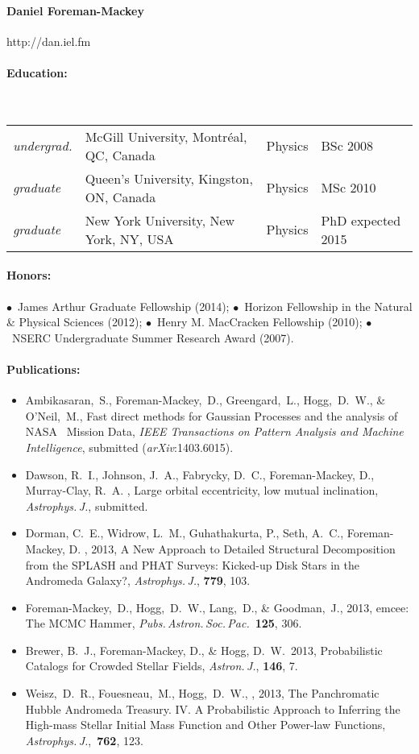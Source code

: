 \documentclass[letterpaper,12pt]{article}
\begin{document}
\paragraph{Daniel Foreman-Mackey} http://dan.iel.fm

\paragraph{Education:}~\\[3pt]
\begin{tabular}{llll}
\textsl{undergrad.}
  & McGill University, Montr\'eal, QC, Canada & Physics & BSc 2008\\
\textsl{graduate}
  & Queen's University, Kingston, ON, Canada & Physics & MSc 2010\\
\textsl{graduate}
  & New York University, New York, NY, USA & Physics & PhD expected 2015
\end{tabular}

\paragraph{Honors:}
$\bullet$~James Arthur Graduate Fellowship (2014);
$\bullet$~Horizon Fellowship in the Natural \& Physical Sciences (2012);
$\bullet$~Henry M. MacCracken Fellowship (2010);
$\bullet$~NSERC Undergraduate Summer Research Award (2007).

\paragraph{Publications:}
\begin{itemize}\setlength{\itemsep}{0pt}
\item
Ambikasaran,~S., Foreman-Mackey,~D., Greengard,~L., Hogg,~D.~W., \& O'Neil,~M.,
{Fast direct methods for Gaussian Processes and the analysis of NASA \Kepler\
Mission Data},
\textit{IEEE Transactions on Pattern Analysis and Machine Intelligence},
submitted (\textit{arXiv}:{1403.6015}).
\item
Dawson, R.~I., Johnson, J.~A., Fabrycky, D.~C., Foreman-Mackey, D.,
Murray-Clay, R.~A. \etal,
{Large orbital eccentricity, low mutual inclination},
\textit{Astrophys.\,J.}, submitted.
\item
Dorman, C.~E., Widrow, L.~M., Guhathakurta, P., Seth, A.~C., Foreman-Mackey,
D. \etal, 2013,
{A New Approach to Detailed Structural Decomposition from the SPLASH and PHAT
Surveys: Kicked-up Disk Stars in the Andromeda Galaxy?},
\textit{Astrophys.\,J.}, \textbf{779}, 103.
\item
Foreman-Mackey,~D., Hogg,~D.~W., Lang,~D., \& Goodman,~J., 2013,
emcee: The MCMC Hammer, \textit{Pubs.\,Astron.\,Soc.\,Pac.}\ \textbf{125}, 306.
\item
Brewer, B.~J., Foreman-Mackey, D., \& Hogg, D.~W.\ 2013,
{Probabilistic Catalogs for Crowded Stellar Fields},
\textit{Astron.\,J.}, \textbf{146}, 7.
\item
Weisz,~D.~R., Fouesneau,~M., Hogg,~D.~W., \etal, 2013,
{The Panchromatic Hubble Andromeda Treasury. IV. A Probabilistic Approach to
Inferring the High-mass Stellar Initial Mass Function and Other Power-law
Functions},
\textit{Astrophys.\,J.},\ \textbf{762}, 123.
\end{itemize}
\end{document}
